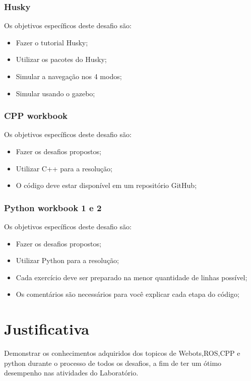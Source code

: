 \subsubsection{Husky}
Os objetivos específicos deste desafio são:
\begin{itemize}
      \item Fazer o tutorial Husky;
      \item Utilizar os pacotes do Husky;
      \item Simular a navegação nos 4 modos;
      \item Simular usando o gazebo;
  \end{itemize}
\subsubsection{CPP workbook}
Os objetivos específicos deste desafio são:
\begin{itemize}
      \item Fazer os desafios propostos;
      \item Utilizar C++ para a resolução;
      \item O código deve estar disponível em um repositório GitHub;
  \end{itemize}
  \subsubsection{Python workbook 1 e 2}
  Os objetivos específicos deste desafio são:
  \begin{itemize}
        \item Fazer os desafios propostos;
        \item Utilizar Python para a resolução;
        \item Cada exercício deve ser preparado na menor quantidade de linhas possível;
        \item Os comentários são necessários para você explicar cada etapa do código;
    \end{itemize}
\section{Justificativa}
\label{sec:justi}

Demonstrar os conhecimentos adquiridos dos topicos de Webots,ROS,CPP e python durante o processo de todos os desafios, 
a fim de ter um ótimo desempenho nas atividades do Laboratório.

